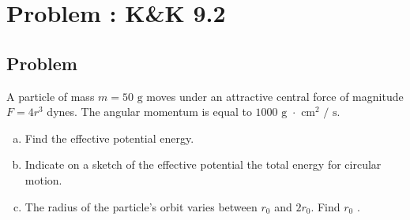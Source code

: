 \documentclass[solutions]{esg8012pset}
\date{\today }
\begin{document}
\section{Problem \thesection: K\&K 9.2}
\subsection{Problem}
  A particle of mass $m = 50\text{ g}$ moves under an attractive central force of magnitude $F = 4r^3$ dynes. The angular momentum is equal to $1000\text{ g $\cdot$ cm$^2$ / s}$.
  \begin{enumerate}[(a)]
    \item Find the effective potential energy.
    \item Indicate on a sketch of the effective potential the total energy for circular motion.
    \item The radius of the particle's orbit varies between $r_0$ and $2r_0$. Find $r_0$ .
  \end{enumerate}
\end{document}
